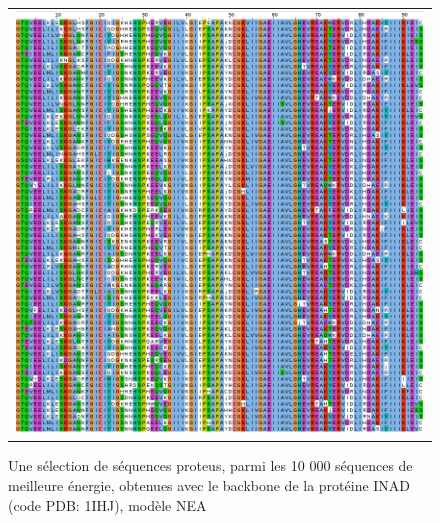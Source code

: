    \begin{figure}[t]
     \centering
     \begin{tabular}{c}
       \includegraphics[width=17cm]{proteus/1IHJ.png} \\
     \end{tabular}
       \caption{Une sélection de séquences proteus, parmi les 10 000 séquences de meilleure énergie, obtenues avec le backbone de la protéine INAD (code PDB: 1IHJ), modèle NEA}
\label{align_proteus:INAD}
   \end{figure}
\clearpage

